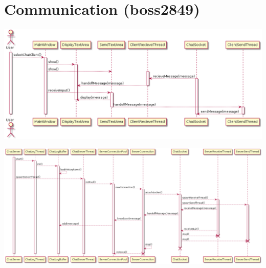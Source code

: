 \documentclass[11pt]{report}
\begin{document}
\section{Communication (boss2849)}
    \begin{minipage}{1\textwidth}
        \begin{center}
            \includegraphics[width=1.0\textwidth]{diagrams/sequence-chat-client}
        \end{center}
        \begin{center}
            \includegraphics[width=1.0\textwidth]{diagrams/sequence-chat-server}
        \end{center}
    \end{minipage}
    
\end{document}
